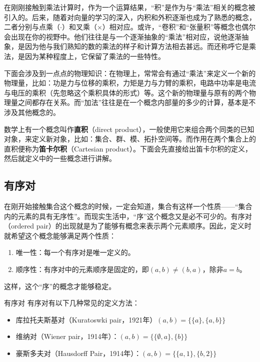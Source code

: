 
\begin{issues}
\issueDraft
\end{issues}

在刚刚接触到乘法计算时，作为一个运算结果，“积”是作为与“乘法”相关的概念被引入的。后来，随着对向量的学习的深入，内积和外积逐渐也成为了熟悉的概念，二者分别与点乘（$\cdot$）和叉乘（$\times$）相对应。或许，“卷积”和“张量积”等概念也偶尔会出现在你的视野中。他们往往是与一个逐渐抽象的“乘法”相对应，说他逐渐抽象，是因为他与我们熟知的数的乘法的样子和计算方法相去甚远。而还称呼它是乘法，是因为某种程度上，它保留了乘法的一些特性。

下面会涉及到一点点的物理知识：在物理上，常常会有通过“乘法”来定义一个新的物理量，比如：功是力与位移的乘积，力矩是力与力臂的乘积，电路中功率是电流与电压的乘积（先忽略这个乘积具体的形式）等。这个新的物理量与原有的两个物理量之间都存在关系。而“加法”往往是在一个概念内部量的多少的计算，基本是不涉及其他概念的。

数学上有一个概念叫作\textbf{直积}（direct product），一般使用它来组合两个同类的已知对象，来定义新对象，比如：集合、群、模、拓扑空间等。而作用在两个集合上的直积便称为\textbf{笛卡尔积}（Cartesian product）。下面会先直接给出笛卡尔积的定义，然后就定义中的一些概念进行讲解。



\subsection{有序对}

在刚开始接触集合这个概念的时候，一定会知道，集合有这样一个性质——“集合内的元素的具有无序性”。而现实生活中，“序”这个概念又是必不可少的。有序对（ordered pair）的出现就是为了能够有概念来表示两个元素顺序。因此，定义时就希望这个概念能够满足两个性质：

\begin{enumerate}
\item 唯一性：每一个有序对是唯一定义的。
\item 顺序性：有序对中的元素顺序是固定的，即$(a, b) \neq (b, a)$，除非$a = b$。
\end{enumerate}

这样，这个“序”的概念才能够稳定。


\begin{definition}{有序对}
有序对有以下几种常见的定义方法：
\begin{itemize}
\item 库拉托夫斯基对（Kuratoswki pair，1921年）$(a, b) = \{\{a\}, \{a, b\}\}$
\item 维纳对（Wiener pair，1914年）：$ (a, b) = \{\{\emptyset, a\}, \{b\}\} $
\item 豪斯多夫对（Hausdorff Pair，1914年）：$ (a, b) = \{\{a, 1\}, \{b, 2\}\} $

\end{itemize}
\end{definition}

